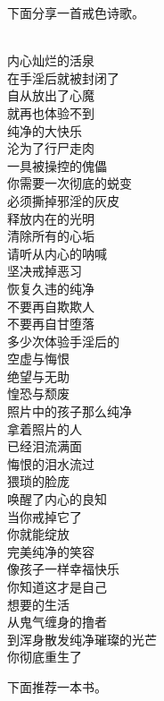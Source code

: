 下面分享一首戒色诗歌。

\begin{poem}[开启内心纯净的活泉]
    \begin{multicols}{3}
        \begin{center}~\\
            内心灿烂的活泉 \\ 在手淫后就被封闭了 \\ 自从放出了心魔 \\ 就再也体验不到 \\ 纯净的大快乐 \\ 沦为了行尸走肉 \\ 一具被操控的傀儡 \\ 你需要一次彻底的蜕变 \\ 必须撕掉邪淫的灰皮 \\ 释放内在的光明 \\ 清除所有的心垢 \\ 请听从内心的呐喊 \\ 坚决戒掉恶习 \\ 恢复久违的纯净 \\ 不要再自欺欺人 \\ 不要再自甘堕落 \\ 多少次体验手淫后的 \\ 空虚与悔恨 \\ 绝望与无助 \\ 惶恐与颓废 \\ 照片中的孩子那么纯净 \\ 拿着照片的人 \\ 已经泪流满面 \\ 悔恨的泪水流过 \\ 猥琐的脸庞 \\ 唤醒了内心的良知 \\ 当你戒掉它了 \\ 你就能绽放 \\ 完美纯净的笑容 \\ 像孩子一样幸福快乐 \\ 你知道这才是自己 \\ 想要的生活 \\ 从鬼气缠身的撸者 \\ 到浑身散发纯净璀璨的光芒 \\ 你彻底重生了
        \end{center}
    \end{multicols}
\end{poem}

下面推荐一本书。

